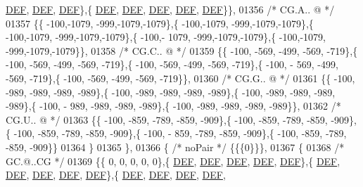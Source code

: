 \begin{DoxyCode}
      \mbox{\hyperlink{1_88_84__epars_8h_a397419fc12b37ed479c8abb9d444d843}{DEF}},  \mbox{\hyperlink{1_88_84__epars_8h_a397419fc12b37ed479c8abb9d444d843}{DEF}},  \mbox{\hyperlink{1_88_84__epars_8h_a397419fc12b37ed479c8abb9d444d843}{DEF}}\},\{  \mbox{\hyperlink{1_88_84__epars_8h_a397419fc12b37ed479c8abb9d444d843}{DEF}},  \mbox{\hyperlink{1_88_84__epars_8h_a397419fc12b37ed479c8abb9d444d843}{DEF}},  \mbox{\hyperlink{1_88_84__epars_8h_a397419fc12b37ed479c8abb9d444d843}{DEF}},  \mbox{\hyperlink{1_88_84__epars_8h_a397419fc12b37ed479c8abb9d444d843}{DEF}},  \mbox{\hyperlink{1_88_84__epars_8h_a397419fc12b37ed479c8abb9d444d843}{DEF}}\}\},
01356 \textcolor{comment}{/* CG.A.. @ */}
01357 \{\{ -100,-1079, -999,-1079,-1079\},\{ -100,-1079, -999,-1079,-1079\},\{ -100,-1079, -999,-1079,-1079\},\{ -100,-
      1079, -999,-1079,-1079\},\{ -100,-1079, -999,-1079,-1079\}\},
01358 \textcolor{comment}{/* CG.C.. @ */}
01359 \{\{ -100, -569, -499, -569, -719\},\{ -100, -569, -499, -569, -719\},\{ -100, -569, -499, -569, -719\},\{ -100, -
      569, -499, -569, -719\},\{ -100, -569, -499, -569, -719\}\},
01360 \textcolor{comment}{/* CG.G.. @ */}
01361 \{\{ -100, -989, -989, -989, -989\},\{ -100, -989, -989, -989, -989\},\{ -100, -989, -989, -989, -989\},\{ -100, -
      989, -989, -989, -989\},\{ -100, -989, -989, -989, -989\}\},
01362 \textcolor{comment}{/* CG.U.. @ */}
01363 \{\{ -100, -859, -789, -859, -909\},\{ -100, -859, -789, -859, -909\},\{ -100, -859, -789, -859, -909\},\{ -100, -
      859, -789, -859, -909\},\{ -100, -859, -789, -859, -909\}\}
01364 \}
01365 \},
01366 \{ \textcolor{comment}{/* noPair */} \{\{\{0\}\}\},
01367 \{
01368 \textcolor{comment}{/* GC.@..CG */}
01369 \{\{    0,    0,    0,    0,    0\},\{  \mbox{\hyperlink{1_88_84__epars_8h_a397419fc12b37ed479c8abb9d444d843}{DEF}},  \mbox{\hyperlink{1_88_84__epars_8h_a397419fc12b37ed479c8abb9d444d843}{DEF}},  \mbox{\hyperlink{1_88_84__epars_8h_a397419fc12b37ed479c8abb9d444d843}{DEF}},  \mbox{\hyperlink{1_88_84__epars_8h_a397419fc12b37ed479c8abb9d444d843}{DEF}},  \mbox{\hyperlink{1_88_84__epars_8h_a397419fc12b37ed479c8abb9d444d843}{DEF}}\},\{  
      \mbox{\hyperlink{1_88_84__epars_8h_a397419fc12b37ed479c8abb9d444d843}{DEF}},  \mbox{\hyperlink{1_88_84__epars_8h_a397419fc12b37ed479c8abb9d444d843}{DEF}},  \mbox{\hyperlink{1_88_84__epars_8h_a397419fc12b37ed479c8abb9d444d843}{DEF}},  \mbox{\hyperlink{1_88_84__epars_8h_a397419fc12b37ed479c8abb9d444d843}{DEF}},  \mbox{\hyperlink{1_88_84__epars_8h_a397419fc12b37ed479c8abb9d444d843}{DEF}}\},\{  \mbox{\hyperlink{1_88_84__epars_8h_a397419fc12b37ed479c8abb9d444d843}{DEF}},  \mbox{\hyperlink{1_88_84__epars_8h_a397419fc12b37ed479c8abb9d444d843}{DEF}},  \mbox{\hyperlink{1_88_84__epars_8h_a397419fc12b37ed479c8abb9d444d843}{DEF}},  \mbox{\hyperlink{1_88_84__epars_8h_a397419fc12b37ed479c8abb9d444d843}{DEF}},  

\end{DoxyCode}

